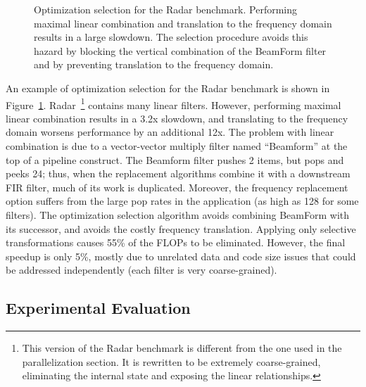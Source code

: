 \begin{figure}[t!]
\vspace{-12pt} %
\vspace{-0.07in}
\centering
{}
\caption[Optimization selection for the Radar benchmark.]{Optimization
selection for the Radar benchmark.  Performing maximal linear
combination and translation to the frequency domain results in a large
slowdown.  The selection procedure avoids this hazard by blocking the
vertical combination of the BeamForm filter and by preventing
translation to the frequency domain.\protect\label{fig:radar}}
\end{figure}

An example of optimization selection for the Radar benchmark is shown
in Figure~\ref{fig:radar}.  Radar~\footnote{This version of the Radar
benchmark is different from the one used in the parallelization
section.  It is rewritten to be extremely coarse-grained, eliminating
the internal state and exposing the linear relationships.} contains
many linear filters.  However, performing maximal linear combination
results in a 3.2x slowdown, and translating to the frequency domain
worsens performance by an additional 12x.  The problem with linear
combination is due to a vector-vector multiply filter named
``Beamform'' at the top of a pipeline construct.  The Beamform filter
pushes 2 items, but pops and peeks 24; thus, when the replacement
algorithms combine it with a downstream FIR filter, much of its work
is duplicated.  Moreover, the frequency replacement option suffers
from the large pop rates in the application (as high as 128 for some
filters).  The optimization selection algorithm avoids combining
BeamForm with its successor, and avoids the costly frequency
translation.  Applying only selective transformations causes 55\% of
the FLOPs to be eliminated.  However, the final speedup is only 5\%,
mostly due to unrelated data and code size issues that could be
addressed independently (each filter is very coarse-grained).

\subsection*{Experimental Evaluation}

